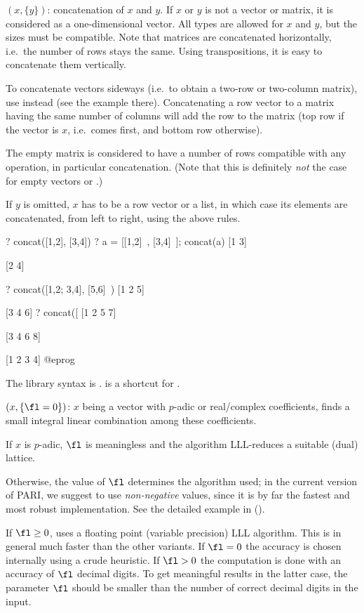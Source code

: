 $(x,\{y\})$: \label{se:concat}concatenation of $x$ and $y$. If $x$ or $y$ is
not a vector or matrix, it is considered as a one-dimensional vector. All
types are allowed for $x$ and $y$, but the sizes must be compatible. Note
that matrices are concatenated horizontally, i.e.~the number of rows stays
the same. Using transpositions, it is easy to concatenate them vertically.

To concatenate vectors sideways (i.e.~to obtain a two-row or two-column
matrix), use  instead (see the example there). Concatenating a row
vector to a matrix having the same number of columns will add the row to the
matrix (top row if the vector is $x$, i.e.~comes first, and bottom row
otherwise).

The empty matrix \kbd{[;]} is considered to have a number of rows compatible
with any operation, in particular concatenation. (Note that this is
definitely \emph{not} the case for empty vectors \kbd{[~]} or \kbd{[~]\til}.)

If $y$ is omitted, $x$ has to be a row vector or a list, in which case its
elements are concatenated, from left to right, using the above rules.

\bprog
? concat([1,2], [3,4])
? a = [[1,2]~, [3,4]~]; concat(a)
[1 3]

[2 4]

? concat([1,2; 3,4], [5,6]~)
[1 2 5]

[3 4 6]
? concat([%
[1 2 5 7]

[3 4 6 8]

[1 2 3 4]
@eprog

The library syntax is .
 is a shortcut for .

$(x,\{\fl=0\})$: \label{se:lindep}$x$ being a
vector with $p$-adic or real/complex coefficients, finds a small integral
linear combination among these coefficients.

If $x$ is $p$-adic, $\fl$ is meaningless and the algorithm LLL-reduces a
suitable (dual) lattice.

Otherwise, the value of $\fl$ determines the algorithm used; in the current
version of PARI, we suggest to use \emph{non-negative} values, since it is by
far the fastest and most robust implementation. See the detailed example in
 ().

If $\fl\geq 0$, uses a floating point (variable precision) LLL algorithm.
This is in general much faster than the other variants.
If $\fl = 0$ the accuracy is chosen internally using a crude heuristic.
If $\fl > 0$ the computation is done with an accuracy of $\fl$ decimal digits.
To get meaningful results in the latter case, the parameter $\fl$ should be
smaller than the number of correct decimal digits in the input.

